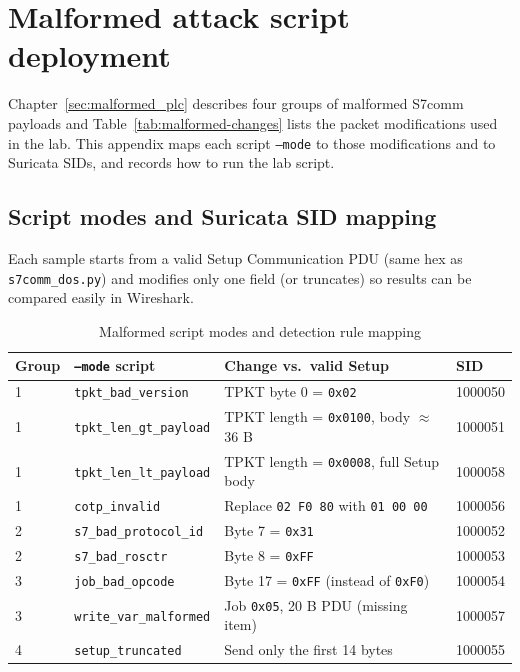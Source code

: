 \documentclass[../main.tex]{subfiles}
\begin{document}
\section{Malformed attack script deployment}
\label{app:malformed-script-deploy}

Chapter~\ref{sec:malformed_plc} describes four groups of malformed S7comm payloads and Table~\ref{tab:malformed-changes} lists the packet modifications used in the lab. This appendix maps each script \texttt{--mode} to those modifications and to Suricata SIDs, and records how to run the lab script.

\subsection{Script modes and Suricata SID mapping}

Each sample starts from a valid Setup Communication PDU (same hex as \texttt{s7comm\_dos.py}) and modifies only one field (or truncates) so results can be compared easily in Wireshark.

\begin{table}[H]
    \centering
    \footnotesize
    \begin{tabular}{|l|l|l|l|}
        \hline
        Group & \texttt{--mode} script & Change vs.\ valid Setup & SID \\
        \hline
        1 & \texttt{tpkt\_bad\_version} & TPKT byte 0 = \texttt{0x02} & 1000050 \\
        \hline
        1 & \texttt{tpkt\_len\_gt\_payload} & TPKT length = \texttt{0x0100}, body $\approx$ 36 B & 1000051 \\
        \hline
        1 & \texttt{tpkt\_len\_lt\_payload} & TPKT length = \texttt{0x0008}, full Setup body & 1000058 \\
        \hline
        1 & \texttt{cotp\_invalid} & Replace \texttt{02 F0 80} with \texttt{01 00 00} & 1000056 \\
        \hline
        2 & \texttt{s7\_bad\_protocol\_id} & Byte 7 = \texttt{0x31} & 1000052 \\
        \hline
        2 & \texttt{s7\_bad\_rosctr} & Byte 8 = \texttt{0xFF} & 1000053 \\
        \hline
        3 & \texttt{job\_bad\_opcode} & Byte 17 = \texttt{0xFF} (instead of \texttt{0xF0}) & 1000054 \\
        \hline
        3 & \texttt{write\_var\_malformed} & Job \texttt{0x05}, 20 B PDU (missing item) & 1000057 \\
        \hline
        4 & \texttt{setup\_truncated} & Send only the first 14 bytes & 1000055 \\
        \hline
    \end{tabular}
    \caption{Malformed script modes and detection rule mapping}
    \label{tab:malformed-phases}
\end{table}
\end{document}
